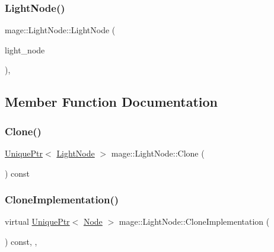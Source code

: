 \hypertarget{classmage_1_1_light_node_a0a2d5ee9e6417d73905d6f35116eccb3}{}\label{classmage_1_1_light_node_a0a2d5ee9e6417d73905d6f35116eccb3} 
\subsubsection{\texorpdfstring{Light\+Node()}{LightNode()}\hspace{0.1cm}{\footnotesize\ttfamily [3/3]}}
{\footnotesize\ttfamily mage\+::\+Light\+Node\+::\+Light\+Node (\begin{DoxyParamCaption}\item[{\hyperlink{classmage_1_1_light_node}{Light\+Node} \&\&}]{light\+\_\+node }\end{DoxyParamCaption})\hspace{0.3cm}{\ttfamily [protected]}, {\ttfamily [default]}}



\subsection{Member Function Documentation}
\hypertarget{classmage_1_1_light_node_a4d0c10f03de71cd497635feb431d02d5}{}\label{classmage_1_1_light_node_a4d0c10f03de71cd497635feb431d02d5} 
\subsubsection{\texorpdfstring{Clone()}{Clone()}}
{\footnotesize\ttfamily \hyperlink{namespacemage_a8c307fbcc33bce9b7f2aa4c26c3b95cf}{Unique\+Ptr}$<$ \hyperlink{classmage_1_1_light_node}{Light\+Node} $>$ mage\+::\+Light\+Node\+::\+Clone (\begin{DoxyParamCaption}{ }\end{DoxyParamCaption}) const}

\hypertarget{classmage_1_1_light_node_aea97601d0a4b8073a1c655ca334af242}{}\label{classmage_1_1_light_node_aea97601d0a4b8073a1c655ca334af242} 
\subsubsection{\texorpdfstring{Clone\+Implementation()}{CloneImplementation()}}
{\footnotesize\ttfamily virtual \hyperlink{namespacemage_a8c307fbcc33bce9b7f2aa4c26c3b95cf}{Unique\+Ptr}$<$ \hyperlink{classmage_1_1_node}{Node} $>$ mage\+::\+Light\+Node\+::\+Clone\+Implementation (\begin{DoxyParamCaption}{ }\end{DoxyParamCaption}) const\hspace{0.3cm}{\ttfamily [override]}, {\ttfamily [private]}, {}}

